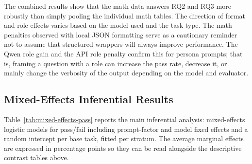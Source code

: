 \documentclass{llncs}
\begin{document}
The combined results show that the math data answers RQ2 and RQ3 more robustly than simply pooling the individual math tables. The direction of format and role effects varies based on the model used and the task type. The math penalties observed with local JSON formatting serve as a cautionary reminder not to assume that structured wrappers will always improve performance. The Qwen role gain and the API role penalty confirm this for persona prompts; that is, framing a question with a role can increase the pass rate, decrease it, or mainly change the verbosity of the output depending on the model and evaluator.

\subsection{Mixed-Effects Inferential Results}\label{mixed-effects-inferential-results}

Table~\ref{tab:mixed-effects-pass} reports the main inferential analysis: mixed-effects logistic models for pass/fail including prompt-factor and model fixed effects and a random intercept per base task, fitted per stratum. The average marginal effects are expressed in percentage points so they can be read alongside the descriptive contrast tables above.
\end{document}
